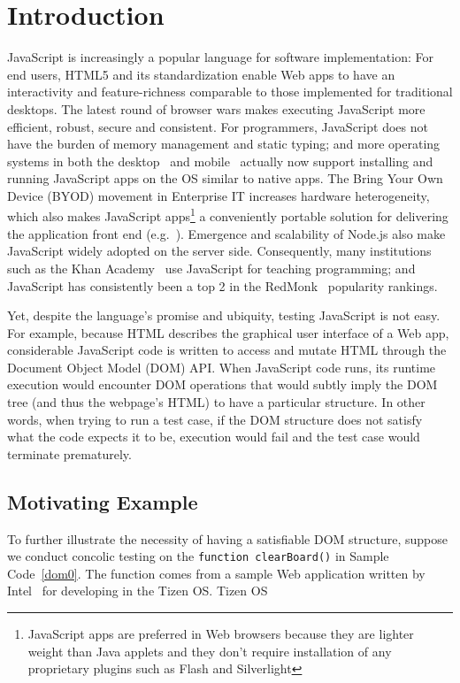 \section{Introduction}
JavaScript is increasingly a popular language for software implementation: %
For end users, HTML5 and its standardization enable Web apps to have an interactivity and feature-richness comparable to those implemented for traditional desktops.  
The latest round of browser wars makes executing JavaScript more efficient, robust, secure and consistent.  
For programmers, JavaScript does not have the burden of memory management and static typing; and more operating systems in both the desktop~\cite{chromeApps, windows8javascript} 
and mobile~\cite{blackberryWebWorks, firefoxOS, androidWebView, tizen} actually now support installing and running JavaScript apps on the OS similar to native apps.
The Bring Your Own Device (BYOD) movement in Enterprise IT increases hardware heterogeneity, 
which also makes JavaScript apps\footnote{JavaScript apps are preferred in Web browsers because they are lighter weight than Java applets and they don't require installation of any proprietary plugins such as Flash and Silverlight} 
a conveniently portable solution for delivering the application front end (e.g.~\cite{BNSFoffice365}).
Emergence and scalability of Node.js also make JavaScript widely adopted on the server side.  
Consequently, many institutions such as the Khan Academy~\cite{khanAcademy} use JavaScript for teaching programming; and JavaScript has consistently been a top 2 in the RedMonk~\cite{redmonk} popularity rankings.%

Yet, despite the language's promise and ubiquity, testing JavaScript is not easy.  
For example, because HTML describes the graphical user interface of a Web app, considerable JavaScript code is written to access and mutate HTML through the Document Object Model (DOM) API.  
When JavaScript code runs, its runtime execution would encounter DOM operations that would subtly imply the DOM tree (and thus the webpage's HTML) to have a particular structure.  
In other words, when trying to run a test case, if the DOM structure does not satisfy what the code expects it to be, execution would fail and the test case would terminate prematurely.  

\subsection{Motivating Example}
To further illustrate the necessity of having a satisfiable DOM structure, suppose we conduct concolic testing on the {\tt function clearBoard()} in Sample Code~\ref{dom0}.  
The function comes from a sample Web application written by Intel~\cite{mancala} for developing in the Tizen OS. 
Tizen OS

